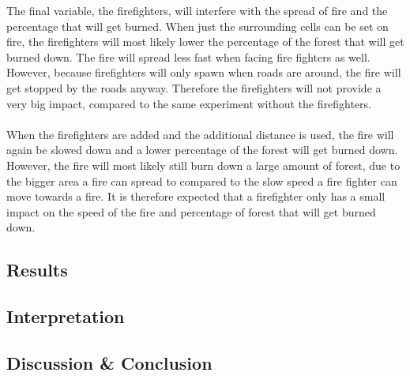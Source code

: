 \documentclass{article}
\begin{document}
\begin{multicols}{2}
The final variable, the firefighters, will interfere with the spread of fire and the percentage that will get burned. When just the surrounding cells can be set on fire, the firefighters will most likely lower the percentage of the forest that will get burned down. The fire will spread less fast when facing fire fighters as well. However, because firefighters will only spawn when roads are around, the fire will get stopped by the roads anyway. Therefore the firefighters will not provide a very big impact, compared to the same experiment without the firefighters.\\\\
When the firefighters are added and the additional distance is used, the fire will again be slowed down and a lower percentage of the forest will get burned down. However, the fire will most likely still burn down a large amount of forest, due to the bigger area a fire can spread to compared to the slow speed a fire fighter can move towards a fire. It is therefore expected that a firefighter only has a small impact on the speed of the fire and percentage of forest that will get burned down.


\subsection*{Results}
\subsection*{Interpretation}

\subsection*{Discussion \& Conclusion}

\nocite{*}


\end{multicols}
\end{document}
